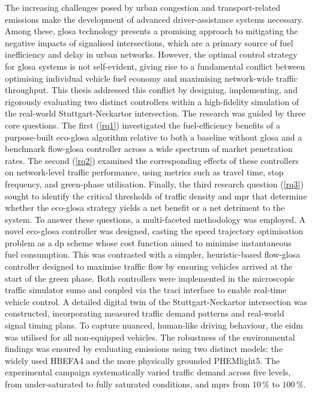 The increasing challenges posed by urban congestion and transport-related emissions make the development of advanced driver-assistance systems necessary. Among these, \ac{glosa} technology presents a promising approach to mitigating the negative impacts of signalised intersections, which are a primary source of fuel inefficiency and delay in urban networks. However, the optimal control strategy for \ac{glosa} systems is not self-evident, giving rise to a fundamental conflict between optimising individual vehicle fuel economy and maximising network-wide traffic throughput. This thesis addressed this conflict by designing, implementing, and rigorously evaluating two distinct controllers within a high-fidelity simulation of the real-world Stuttgart-Neckartor intersection.
\mynewline
The research was guided by three core questions. The first (\ref{rq1}) investigated the fuel-efficiency benefits of a purpose-built \ac{eco-glosa} algorithm relative to both a baseline without \ac{glosa} and a benchmark \ac{flow-glosa} controller across a wide spectrum of market penetration rates. The second (\ref{rq2}) examined the corresponding effects of these controllers on network-level traffic performance, using metrics such as travel time, stop frequency, and green-phase utilisation. Finally, the third research question (\ref{rq3}) sought to identify the critical thresholds of traffic density and \ac{mpr} that determine whether the \ac{eco-glosa} strategy yields a net benefit or a net detriment to the system.
\mynewline
To answer these questions, a multi-faceted methodology was employed. A novel \ac{eco-glosa} controller was designed, casting the speed trajectory optimisation problem as a \ac{dp} scheme whose cost function aimed to minimise instantaneous fuel consumption. This was contrasted with a simpler, heuristic-based \ac{flow-glosa} controller designed to maximise traffic flow by ensuring vehicles arrived at the start of the green phase. Both controllers were implemented in the microscopic traffic simulator \ac{sumo} and coupled via the \ac{traci} interface to enable real-time vehicle control. A detailed digital twin of the Stuttgart-Neckartor intersection was constructed, incorporating measured traffic demand patterns and real-world signal timing plans. To capture nuanced, human-like driving behaviour, the \ac{eidm} was utilised for all non-equipped vehicles. The robustness of the environmental findings was ensured by evaluating emissions using two distinct models: the widely used HBEFA4 and the more physically grounded PHEMlight5. The experimental campaign systematically varied traffic demand across five levels, from under-saturated to fully saturated conditions, and \acp{mpr} from $10\,\%$ to $100\,\%$.
